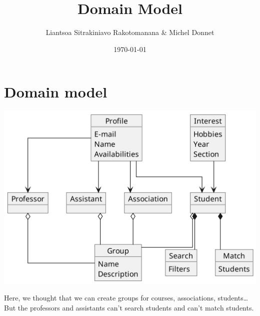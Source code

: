 \documentclass[11pt]{article}
\author{Liantsoa Sitrakiniavo Rakotomanana \& Michel Donnet}
\date{\today}
\title{Domain Model}
\begin{document}
\maketitle




\section{Domain model}
\label{sec:org1271282}


\begin{center}
\includegraphics[width=.9\linewidth]{./uml.png}
\end{center}


Here, we thought that we can create groups for courses, associations, students\ldots{}
But the professors and assistants can't search students and can't match students.
\end{document}
